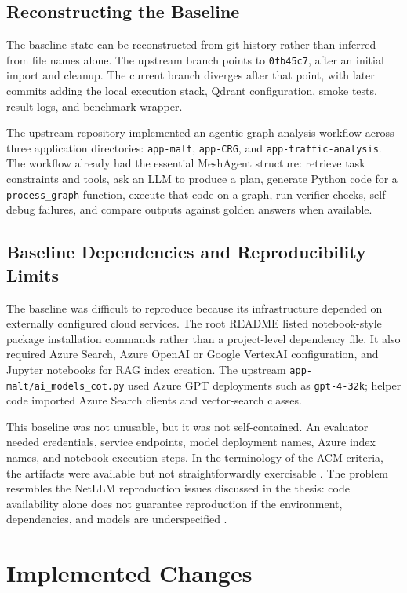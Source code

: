 \documentclass[11pt,a4paper]{article}
\newcommand{\commit}[1]{\texttt{#1}}
\begin{document}
\subsection{Reconstructing the Baseline}

The baseline state can be reconstructed from git history rather than inferred from file names alone. The upstream branch points to \commit{0fb45c7}, after an initial import and cleanup. The current branch diverges after that point, with later commits adding the local execution stack, Qdrant configuration, smoke tests, result logs, and benchmark wrapper.

The upstream repository implemented an agentic graph-analysis workflow across three application directories: \texttt{app-malt}, \texttt{app-CRG}, and \texttt{app-traffic-analysis}. The workflow already had the essential MeshAgent structure: retrieve task constraints and tools, ask an LLM to produce a plan, generate Python code for a \texttt{process\_graph} function, execute that code on a graph, run verifier checks, self-debug failures, and compare outputs against golden answers when available.

\subsection{Baseline Dependencies and Reproducibility Limits}

The baseline was difficult to reproduce because its infrastructure depended on externally configured cloud services. The root README listed notebook-style package installation commands rather than a project-level dependency file. It also required Azure Search, Azure OpenAI or Google VertexAI configuration, and Jupyter notebooks for RAG index creation. The upstream \texttt{app-malt/ai\_models\_cot.py} used Azure GPT deployments such as \texttt{gpt-4-32k}; helper code imported Azure Search clients and vector-search classes.

This baseline was not unusable, but it was not self-contained. An evaluator needed credentials, service endpoints, model deployment names, Azure index names, and notebook execution steps. In the terminology of the ACM criteria, the artifacts were available but not straightforwardly exercisable \cite{acm2020badging}. The problem resembles the NetLLM reproduction issues discussed in the thesis: code availability alone does not guarantee reproduction if the environment, dependencies, and models are underspecified \cite{rissanen2026netllm}.

\section{Implemented Changes}
\end{document}
